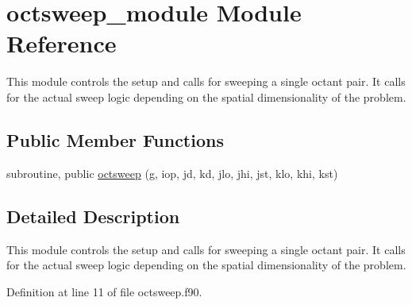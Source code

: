 \hypertarget{classoctsweep__module}{\section{octsweep\-\_\-module Module Reference}
\label{classoctsweep__module}
}


This module controls the setup and calls for sweeping a single octant pair. It calls for the actual sweep logic depending on the spatial dimensionality of the problem.  


\subsection*{Public Member Functions}
\begin{DoxyCompactItemize}
\item 
subroutine, public \hyperlink{classoctsweep__module_af58dfb8973e3755aeeaa82bae73d2aef}{octsweep} (g, iop, jd, kd, jlo, jhi, jst, klo, khi, kst)
\end{DoxyCompactItemize}


\subsection{Detailed Description}
This module controls the setup and calls for sweeping a single octant pair. It calls for the actual sweep logic depending on the spatial dimensionality of the problem. 

Definition at line 11 of file octsweep.\-f90.



